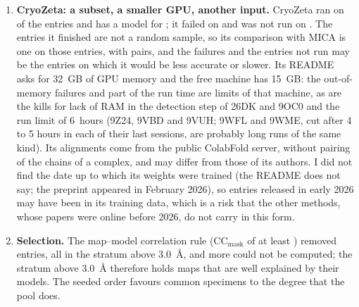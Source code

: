 \begin{enumerate}
\item \textbf{CryoZeta: a subset, a smaller GPU, another input.} CryoZeta ran on \NRanCryozeta{} of the \NEntries{} entries and has a model for \NModelCryozeta{}; it failed on \FailedListCryozeta{} and was not run on \NotRunListCryozeta{}. The entries it finished are not a random sample, so its comparison with MICA is one on those entries, with \NPairsTmCryozeta{} pairs, and the failures and the entries not run may be the entries on which it would be less accurate or slower. Its README asks for 32~GB of GPU memory and the free machine has 15~GB: the out-of-memory failures and part of the run time are limits of that machine, as are the kills for lack of RAM in the detection step of 26DK and 9OC0 and the run limit of 6~hours (9Z24, 9VBD and 9VUH; 9WFL and 9WME, cut after 4 to 5 hours in each of their last sessions, are probably long runs of the same kind). Its alignments come from the public ColabFold server, without pairing of the chains of a complex, and may differ from those of its authors. I did not find the date up to which its weights were trained (the README does not say; the preprint appeared in February 2026), so entries released in early 2026 may have been in its training data, which is a risk that the other methods, whose papers were online before 2026, do not carry in this form.
\item \textbf{Selection.} The map--model correlation rule (CC$_\text{mask}$ of at least \SelCcMin{}) removed \SelCcRejected{} entries, all in the stratum above 3.0~\AA{}, and \SelCcFailed{} more could not be computed; the stratum above 3.0~\AA{} therefore holds maps that are well explained by their models. The seeded order favours common specimens to the degree that the pool does.
\end{enumerate}
